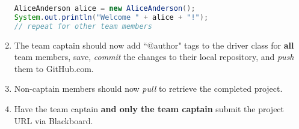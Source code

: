 \documentclass{article}
\begin{document}
\begin{enumerate}
\begin{lstlisting}[language=Java, frame=single]
AliceAnderson alice = new AliceAnderson();
System.out.println("Welcome " + alice + "!");
// repeat for other team members
\end{lstlisting}
	\item The team captain should now add ``@author" tags to the driver class for {\bf all} team members, save, {\it commit} the changes to their local repository, and {\it push} them to GitHub.com.
	\item Non-captain members should now {\it pull} to retrieve the completed project.
	\item Have the team captain {\bf and only the team captain} submit the project URL via Blackboard. 
	

\end{enumerate}
\end{document}
